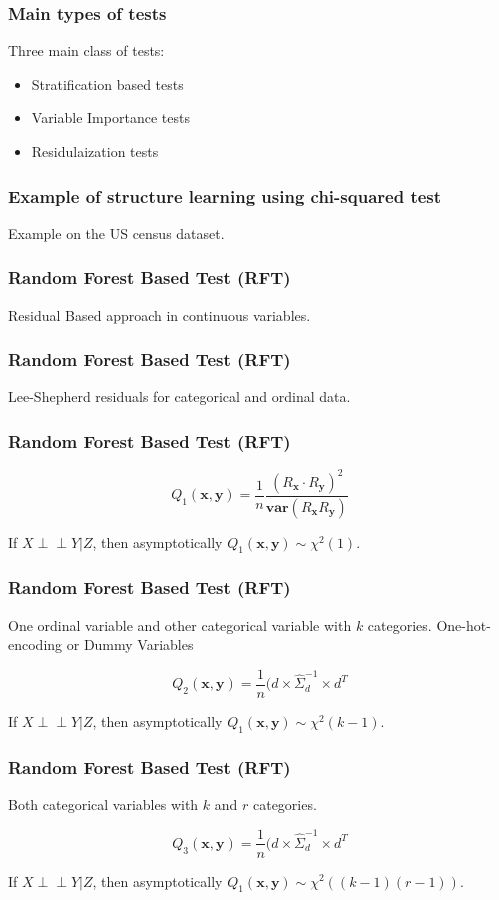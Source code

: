 \documentclass{beamer}
\def\ci{\perp\!\!\!\!\!\perp}
\begin{document}
\begin{frame}
	\frametitle{Main types of tests}
	Three main class of tests:
		\begin{itemize}
			\item Stratification based tests
			\item Variable Importance tests
			\item Residulaization tests
		\end{itemize}
\end{frame}

\begin{frame}
	\frametitle{Example of structure learning using chi-squared test}
	Example on the US census dataset.
\end{frame}


\begin{frame}
	\frametitle{Random Forest Based Test (RFT)}
	Residual Based approach in continuous variables.

\end{frame}

\begin{frame}
	\frametitle{Random Forest Based Test (RFT)}
	Lee-Shepherd residuals for categorical and ordinal data.

\end{frame}

\begin{frame}
	\frametitle{Random Forest Based Test (RFT)}
	$$ Q_1(\bm{x}, \bm{y}) = \frac{1}{n} \frac{(R_{\bm{x}} \cdot R_{\bm{y}})^2}{\bm{var}(R_{\bm{x}} R_{\bm{y}})} $$

	If $ X \ci Y | Z $, then asymptotically $ Q_1(\bm{x}, \bm{y}) \sim \chi^2(1) $.
\end{frame}

\begin{frame}
	\frametitle{Random Forest Based Test (RFT)}
	One ordinal variable and other categorical variable with $ k $ categories.
	One-hot-encoding or Dummy Variables


	$$ Q_2(\bm{x}, \bm{y}) = \frac{1}{n} (d \times \hat{\Sigma}_d^{-1} \times d^T $$

	If $ X \ci Y | Z $, then asymptotically $ Q_1(\bm{x}, \bm{y}) \sim \chi^2(k-1) $.
\end{frame}

\begin{frame}
	\frametitle{Random Forest Based Test (RFT)}
	Both categorical variables with $ k $ and $ r $ categories.


	$$ Q_3(\bm{x}, \bm{y}) = \frac{1}{n} (d \times \hat{\Sigma}_d^{-1} \times d^T $$

	If $ X \ci Y | Z $, then asymptotically $ Q_1(\bm{x}, \bm{y}) \sim
	\chi^2((k-1)(r-1)) $.
\end{frame}
\end{document}
